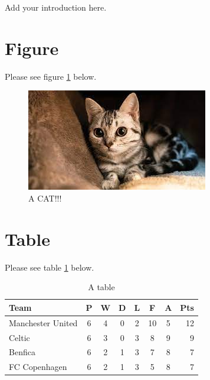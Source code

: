 \hspace{24pt}

Add your introduction here.

\section{Figure}

Please see figure \ref{fig:cat} below.

\begin{figure}[h]
	\centering
	\includegraphics[scale=0.2]{images/cat.jpg}
	\caption{A CAT!!!}
	\label{fig:cat}
\end{figure}

\section{Table}

Please see table \ref{tab:test} below.

\begin{table}[h]
    \centering
    
    
    \begin{tabular}{l*{6}{c}r}
    Team              & P & W & D & L & F  & A & Pts \\
    \hline
    Manchester United & 6 & 4 & 0 & 2 & 10 & 5 & 12  \\
    Celtic            & 6 & 3 & 0 & 3 &  8 & 9 &  9  \\
    Benfica           & 6 & 2 & 1 & 3 &  7 & 8 &  7  \\
    FC Copenhagen     & 6 & 2 & 1 & 3 &  5 & 8 &  7  \\
    \end{tabular}
    
    
    \caption{A table}
    \label{tab:test}
\end{table}
